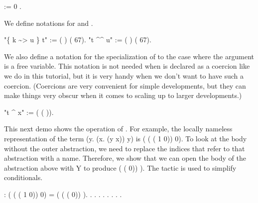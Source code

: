 \documentclass[12pt]{report}
\begin{document}
\begin{coqdoccode}
\coqdocemptyline
\coqdocnoindent
{}    :=  0  .\coqdoceol
\coqdocemptyline
\end{coqdoccode}
We define notations for  and . 
\begin{coqdoccode}
\coqdocemptyline
\coqdocnoindent
{} "\{ k \~{}> u \} t" := (   ) (  67).\coqdoceol
\coqdocnoindent
{} "t \^{}\^{} u" := (  ) (  67).\coqdoceol
\coqdocemptyline
\end{coqdoccode}
We also define a notation for the specialization of  to
    the case where the argument is a free variable. This notation
    is not needed when  is declared as a coercion like
    we do in this tutorial, but it is very handy when we don't want
    to have such a coercion. (Coercions are very convenient for
    simple developments, but they can make things very obscur when
    it comes to scaling up to larger developments.)  
\begin{coqdoccode}
\coqdocemptyline
\coqdocnoindent
{} "t \^{} x" := (  ( )).\coqdoceol
\coqdocemptyline
\end{coqdoccode}
This next demo shows the operation of .  For example, the
   locally nameless representation of the term (y. (x. (y x)) y)
   is  ( ( ( 1 0)) 0). To look at the body
   without the outer abstraction, we need to replace the indices that
   refer to that abstraction with a name.
   Therefore, we show that we can open the body of the abstraction
   above with Y to produce  ( (  0)) ).
   The tactic  is used to simplify conditionals.

\begin{coqdoccode}
\coqdocemptyline
\coqdocnoindent
{}  :\coqdoceol
\coqdocindent{1.00em}
 ( ( ( 1 0)) 0)  =\coqdoceol
\coqdocindent{3.50em}
( ( (  0)) ).\coqdoceol
\coqdocnoindent
{}.\coqdoceol
\coqdocindent{1.00em}
 .  . . . . .\coqdoceol
\coqdocnoindent
{}.\coqdoceol
\coqdocemptyline
\end{coqdoccode}
\end{document}
